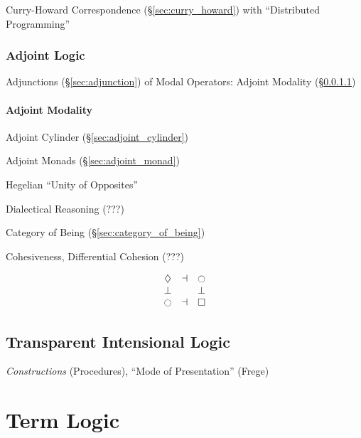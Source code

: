 Curry-Howard Correspondence (\S\ref{sec:curry_howard}) with
``Distributed Programming''



\subsubsection{Adjoint Logic}\label{sec:adjoint_logic}

Adjunctions (\S\ref{sec:adjunction}) of Modal Operators: Adjoint
Modality (\S\ref{sec:adjoint_modality})



\paragraph{Adjoint Modality}\label{sec:adjoint_modality}\hfill

Adjoint Cylinder (\S\ref{sec:adjoint_cylinder})

Adjoint Monads (\S\ref{sec:adjoint_monad})

Hegelian ``Unity of Opposites''

Dialectical Reasoning (???) %

Category of Being (\S\ref{sec:category_of_being})

Cohesiveness, Differential Cohesion (???)

\[
  \begin{matrix}
    \lozenge & \dashv & \ocircle \\
    \bot & \empty & \bot \\
    \ocircle & \dashv & \square
  \end{matrix}
\]



\subsection{Transparent Intensional Logic}
\label{sec:transparent_intensional_logic}

\emph{Constructions} (Procedures), ``Mode of Presentation'' (Frege)



\section{Term Logic}\label{sec:term_logic}

